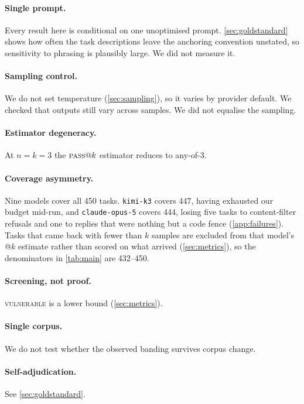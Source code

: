 \documentclass[11pt]{article}
\newcommand{\pass}{\textsc{pass}}
\newcommand{\vuln}{\textsc{vulnerable}}
\begin{document}
\paragraph{Single prompt.} Every result here is conditional on one
unoptimised prompt. \cref{sec:goldstandard} shows how often the task
descriptions leave the anchoring convention unstated, so sensitivity to
phrasing is plausibly large. We did not measure it.

\paragraph{Sampling control.} We do not set temperature
(\cref{sec:sampling}), so it varies by provider default. We checked that
outputs still vary across samples. We did not equalise the sampling.

\paragraph{Estimator degeneracy.} At $n=k=3$ the $\pass{}@k$ estimator
reduces to any-of-3.

\paragraph{Coverage asymmetry.} Nine models cover all 450 tasks.
\texttt{kimi-k3} covers 447, having exhausted our budget mid-run, and
\texttt{claude-opus-5} covers 444, losing five tasks to content-filter
refusals and one to replies that were nothing but a code fence
(\cref{app:failures}). Tasks that came back
with fewer than $k$ samples are excluded from that model's @$k$ estimate
rather than scored on what arrived (\cref{sec:metrics}), so the denominators
in \cref{tab:main} are 432--450.

\paragraph{Screening, not proof.} \vuln{} is a lower bound
(\cref{sec:metrics}).

\paragraph{Single corpus.} We do not test whether the observed banding
survives corpus change.

\paragraph{Self-adjudication.} See \cref{sec:goldstandard}.
\end{document}
